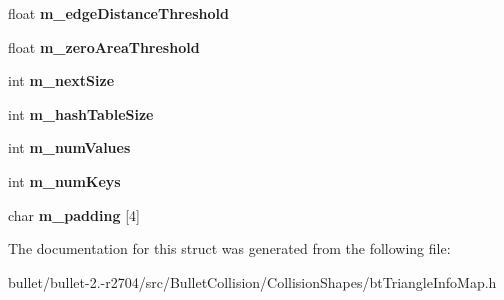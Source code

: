 \begin{DoxyCompactItemize}
\item 
\hypertarget{structbt_triangle_info_map_data_ad1b269a63be2f23a1b352da37bc7677c}{float {\bfseries m\+\_\+edge\+Distance\+Threshold}}\label{structbt_triangle_info_map_data_ad1b269a63be2f23a1b352da37bc7677c}

\item 
\hypertarget{structbt_triangle_info_map_data_a2a76169d4a2f607a2178a09bff2561e0}{float {\bfseries m\+\_\+zero\+Area\+Threshold}}\label{structbt_triangle_info_map_data_a2a76169d4a2f607a2178a09bff2561e0}

\item 
\hypertarget{structbt_triangle_info_map_data_abbca0be2dfdf1fc1273424e358b6aad9}{int {\bfseries m\+\_\+next\+Size}}\label{structbt_triangle_info_map_data_abbca0be2dfdf1fc1273424e358b6aad9}

\item 
\hypertarget{structbt_triangle_info_map_data_a4237db38388cc48e1ca544710bc71c05}{int {\bfseries m\+\_\+hash\+Table\+Size}}\label{structbt_triangle_info_map_data_a4237db38388cc48e1ca544710bc71c05}

\item 
\hypertarget{structbt_triangle_info_map_data_acdc8fc834822353be510f465ac6d1e99}{int {\bfseries m\+\_\+num\+Values}}\label{structbt_triangle_info_map_data_acdc8fc834822353be510f465ac6d1e99}

\item 
\hypertarget{structbt_triangle_info_map_data_a9b83f5637b8c46f17b2ab2067beb6066}{int {\bfseries m\+\_\+num\+Keys}}\label{structbt_triangle_info_map_data_a9b83f5637b8c46f17b2ab2067beb6066}

\item 
\hypertarget{structbt_triangle_info_map_data_a77300060d0b5701bd715effeec7086e3}{char {\bfseries m\+\_\+padding} \mbox{[}4\mbox{]}}\label{structbt_triangle_info_map_data_a77300060d0b5701bd715effeec7086e3}

\end{DoxyCompactItemize}


The documentation for this struct was generated from the following file\+:\begin{DoxyCompactItemize}
\item 
bullet/bullet-\/2.-\/r2704/src/\+Bullet\+Collision/\+Collision\+Shapes/bt\+Triangle\+Info\+Map.\+h\end{DoxyCompactItemize}
